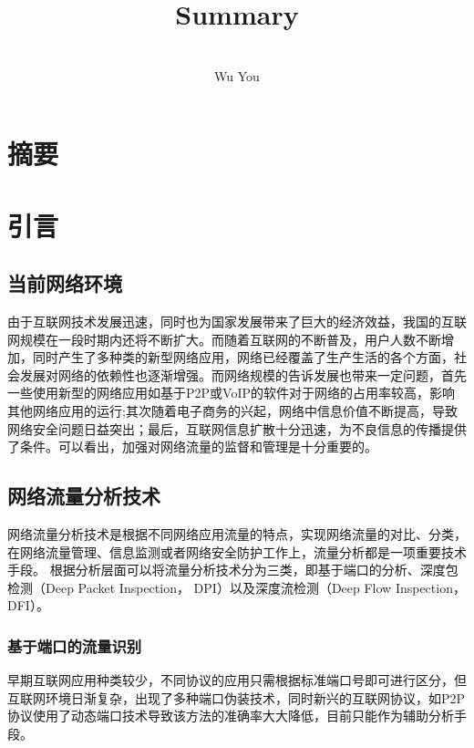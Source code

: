 \documentclass[a4papper]{article}
\title{}
\title{Summary}
\author{ \\
Wu You\\ 
}
\begin{document}
\maketitle
\section*{摘要}

\newpage
\tableofcontents
\thispagestyle{empty}%
\newpage
\setcounter{page}{1}%
\setcounter{section}{0}%

\section{引言}

\subsection{当前网络环境}
\par\setlength{\parindent}{2em} %
由于互联网技术发展迅速，同时也为国家发展带来了巨大的经济效益，我国的互联网规模在一段时期内还将不断扩大。而随着互联网的不断普及，用户人数不断增加，同时产生了多种类的新型网络应用，网络已经覆盖了生产生活的各个方面，社会发展对网络的依赖性也逐渐增强。而网络规模的告诉发展也带来一定问题，首先一些使用新型的网络应用如基于P2P或VoIP的软件对于网络的占用率较高，影响其他网络应用的运行;其次随着电子商务的兴起，网络中信息价值不断提高，导致网络安全问题日益突出；最后，互联网信息扩散十分迅速，为不良信息的传播提供了条件。\cite{林冠洲2011网络流量识别关键技术研究}可以看出，加强对网络流量的监督和管理是十分重要的。
\subsection{网络流量分析技术}
\par\setlength{\parindent}{2em} %
网络流量分析技术是根据不同网络应用流量的特点，实现网络流量的对比、分类，在网络流量管理、信息监测或者网络安全防护工作上，流量分析都是一项重要技术手段。
根据分析层面可以将流量分析技术分为三类，即基于端口的分析、深度包检测（Deep Packet Inspection， DPI）以及深度流检测（Deep Flow Inspection， DFI）。
\subsubsection{基于端口的流量识别}
\par\setlength{\parindent}{2em} %
早期互联网应用种类较少，不同协议的应用只需根据标准端口号即可进行区分，但互联网环境日渐复杂，出现了多种端口伪装技术，同时新兴的互联网协议，如P2P协议使用了动态端口技术导致该方法的准确率大大降低，目前只能作为辅助分析手段。\cite{柏骏2013实时网络流量分类研究综述}
\end{document}
